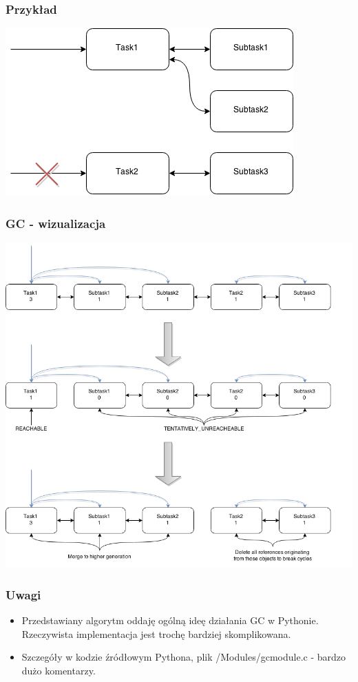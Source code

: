 \documentclass{beamer}
\begin{document}
    \begin{frame}
        \frametitle{Przykład}
        \begin{center}
            \includegraphics[height=0.5\textheight]{graph_remove.png}
        \end{center}
    \end{frame}

    \begin{frame}
        \frametitle{GC - wizualizacja}
        \begin{center}
            \includegraphics[height=0.8\textheight]{full_gc_drawing.png}
        \end{center}
    \end{frame}

    \begin{frame}
        \frametitle{Uwagi}
        \begin{itemize}
            \item Przedstawiany algorytm oddaję ogólną ideę działania GC w Pythonie. Rzeczywista implementacja jest trochę bardziej skomplikowana.
            \item Szczegóły w kodzie źródłowym Pythona, plik /Modules/gcmodule.c - bardzo dużo komentarzy.
        \end{itemize}
    \end{frame}
\end{document}
